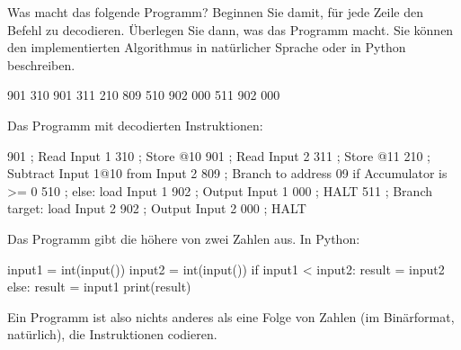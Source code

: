 \cprotEnv\begin{question}
	Was macht das folgende Programm? Beginnen Sie damit, für jede Zeile den Befehl zu decodieren. Überlegen Sie dann, was das Programm macht. Sie können den implementierten Algorithmus in natürlicher Sprache oder in Python beschreiben.

	\begin{assembly}
		901
		310
		901
		311
		210
		809
		510
		902
		000
		511
		902
		000
	\end{assembly}
\end{question}
\cprotEnv\begin{solution}
	Das Programm mit decodierten Instruktionen:
	\begin{assembly}
		901  ; Read Input 1
		310  ; Store @10
		901  ; Read Input 2
		311  ; Store @11
		210  ; Subtract Input 1@10 from Input 2
		809  ; Branch to address 09 if Accumulator is >= 0
		510  ; else: load Input 1
		902  ; Output Input 1
		000  ; HALT
		511  ; Branch target: load Input 2
		902  ; Output Input 2
		000  ; HALT
	\end{assembly}

	Das Programm gibt die höhere von zwei Zahlen aus. In Python:
	\begin{python}
		input1 = int(input())
		input2 = int(input())
		if input1 < input2:
			result = input2
		else:
			result = input1
		print(result)
	\end{python}
	
\end{solution}

Ein Programm ist also nichts anderes als eine Folge von Zahlen (im Binärformat, natürlich), die Instruktionen codieren.
    

